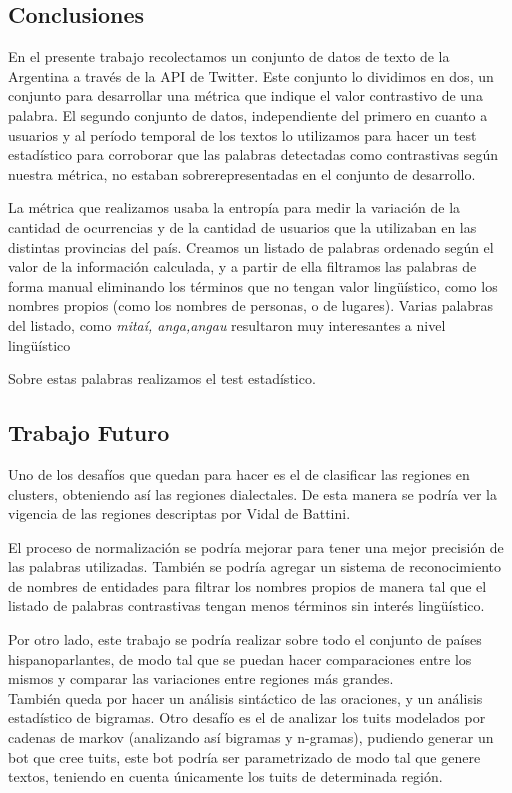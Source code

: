 
\subsection{Conclusiones}
En el presente trabajo recolectamos un conjunto de datos de texto de la Argentina a través de la API de Twitter. Este conjunto lo dividimos en dos, un conjunto para desarrollar una métrica que indique el valor contrastivo de una palabra. El segundo conjunto de datos, independiente del primero en cuanto a usuarios y al período temporal de los textos lo utilizamos para hacer un test estadístico para corroborar que las palabras detectadas como contrastivas según nuestra métrica, no estaban sobrerepresentadas en el conjunto de desarrollo.

La métrica que realizamos usaba la entropía para medir la variación de la cantidad de ocurrencias y de la cantidad de usuarios que la utilizaban en las distintas provincias del país. Creamos un listado de palabras ordenado según el valor de la información calculada, y a partir de ella filtramos las palabras de forma manual eliminando los términos que no tengan valor lingüístico, como los nombres propios (como los nombres de personas, o de lugares). Varias palabras del listado, como \textit{mitaí, anga,angau} resultaron muy interesantes a nivel lingüístico


Sobre estas palabras realizamos el test estadístico. 

\subsection{Trabajo Futuro}

Uno de los desafíos que quedan para hacer es el de clasificar las regiones en clusters, obteniendo así las regiones dialectales. De esta manera se podría ver la vigencia de las regiones descriptas por Vidal de Battini. %

El proceso de normalización se podría mejorar para tener una mejor precisión de las palabras utilizadas. También se podría agregar un sistema de reconocimiento de nombres de entidades para filtrar los nombres propios de manera tal que el listado de palabras contrastivas tengan menos términos sin interés lingüístico.

Por otro lado, este trabajo se podría realizar sobre todo el conjunto de países hispanoparlantes, de modo tal que se puedan hacer comparaciones entre los mismos y comparar las variaciones entre regiones más grandes.\\

También queda por hacer un análisis sintáctico de las oraciones, y un análisis estadístico de bigramas.
Otro desafío es el de analizar los tuits modelados por cadenas de markov (analizando así bigramas y n-gramas), pudiendo generar un bot que cree tuits, este bot podría ser parametrizado de modo tal que genere textos, teniendo en cuenta únicamente los tuits de determinada región.

